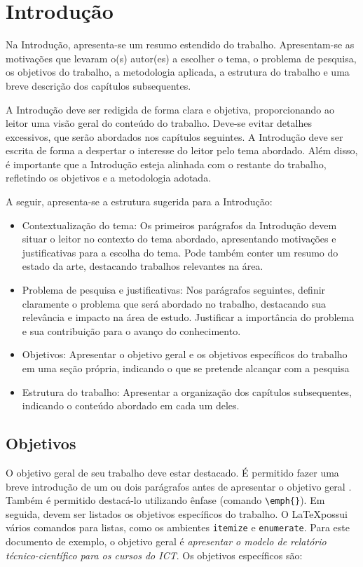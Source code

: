 \chapter{Introdução}\label{cap:introducao}

Na Introdução, apresenta-se um resumo estendido do trabalho. Apresentam-se as motivações que levaram
o(s) autor(es) a escolher o tema, o problema de pesquisa, os objetivos do trabalho, a metodologia aplicada,
a estrutura do trabalho e uma breve descrição dos capítulos subsequentes.

A Introdução deve ser redigida de forma clara e objetiva, proporcionando ao leitor uma visão geral
do conteúdo do trabalho. Deve-se evitar detalhes excessivos, que serão abordados nos capítulos
seguintes. A Introdução deve ser escrita de forma a despertar o interesse do leitor pelo tema abordado.
Além disso, é importante que a Introdução esteja alinhada com o restante do trabalho, refletindo os
objetivos e a metodologia adotada.

A seguir, apresenta-se a estrutura sugerida para a Introdução:
\begin{itemize}
    \item Contextualização do tema: Os primeiros parágrafos da Introdução devem situar o leitor no contexto do tema abordado, apresentando motivações e justificativas para a escolha do tema. Pode também conter um resumo do estado da arte, destacando trabalhos relevantes na área.
    \item Problema de pesquisa e justificativas: Nos parágrafos seguintes, definir claramente o problema que será abordado no trabalho, destacando sua relevância e impacto na área de estudo. Justificar a importância do problema e sua contribuição para o avanço do conhecimento.
    \item Objetivos: Apresentar o objetivo geral e os objetivos específicos do trabalho em uma seção própria, indicando o que se pretende alcançar com a pesquisa
    \item Estrutura do trabalho: Apresentar a organização dos capítulos subsequentes, indicando o conteúdo abordado em cada um deles.
\end{itemize}

\section{Objetivos}\label{sec:objetivos}

O objetivo geral de seu trabalho deve estar destacado. É permitido fazer uma breve introdução de um ou dois parágrafos antes de apresentar o objetivo geral . Também é permitido destacá-lo utilizando ênfase (comando \verb"\emph{}"). Em seguida, devem ser listados os objetivos específicos do trabalho. O \LaTeX possui vários comandos para listas, como os ambientes \verb"itemize" e \verb"enumerate". Para este documento de exemplo, o objetivo geral é \emph{apresentar o modelo de relatório técnico-científico para os cursos do ICT}. Os objetivos específicos são:


